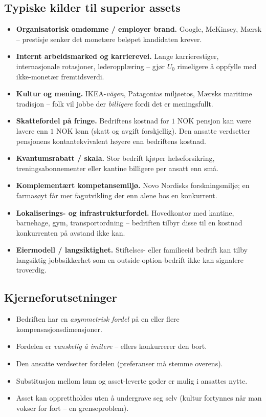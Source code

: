 \subsection*{Typiske kilder til superior assets}
\begin{itemize}
\item \textbf{Organisatorisk omdømme / employer brand.} Google, McKinsey, Mærsk -- prestisje senker det monetære beløpet kandidaten krever.
\item \textbf{Internt arbeidsmarked og karrierevei.} Lange karrierestiger, internasjonale rotasjoner, lederopplæring -- gjør $U_0$ rimeligere å oppfylle med ikke-monetær fremtidsverdi.
\item \textbf{Kultur og mening.} IKEA-\emph{vägen}, Patagonias miljøetos, Mærsks maritime tradisjon -- folk vil jobbe der \emph{billigere} fordi det er meningsfullt.
\item \textbf{Skattefordel på fringe.} Bedriftens kostnad for $1$ NOK pensjon kan være lavere enn $1$ NOK lønn (skatt og avgift forskjellig). Den ansatte verdsetter pensjonens kontantekvivalent høyere enn bedriftens kostnad.
\item \textbf{Kvantumsrabatt / skala.} Stor bedrift kjøper helseforsikring, treningsabonnementer eller kantine billigere per ansatt enn små.
\item \textbf{Komplementært kompetansemiljø.} Novo Nordisks forskningsmiljø; en farmasøyt får mer fagutvikling der enn alene hos en konkurrent.
\item \textbf{Lokaliserings- og infrastrukturfordel.} Hovedkontor med kantine, barnehage, gym, transportordning -- bedriften tilbyr disse til en kostnad konkurrenten på avstand ikke kan.
\item \textbf{Eiermodell / langsiktighet.} Stiftelses- eller familieeid bedrift kan tilby langsiktig jobbsikkerhet som en outside-option-bedrift ikke kan signalere troverdig.
\end{itemize}

\subsection*{Kjerneforutsetninger}
\begin{itemize}
\item Bedriften har en \emph{asymmetrisk fordel} på en eller flere kompensasjonsdimensjoner.
\item Fordelen er \emph{vanskelig å imitere} -- ellers konkurrerer den bort.
\item Den ansatte verdsetter fordelen (preferanser må stemme overens).
\item Substitusjon mellom lønn og asset-leverte goder er mulig i ansattes nytte.
\item Asset kan opprettholdes uten å undergrave seg selv (kultur fortynnes når man vokser for fort -- en grenseproblem).
\end{itemize}

